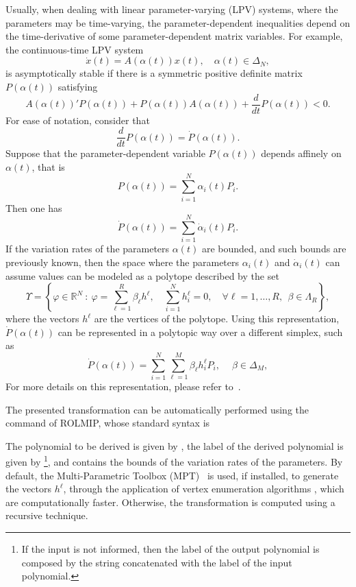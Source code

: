 \documentclass[english,11pt]{article}
\theoremstyle{break} \theorembodyfont{\small\rm}
\begin{document}
Usually, when dealing with linear parameter-varying (LPV) systems, where the parameters
may be time-varying, the parameter-dependent inequalities depend on the time-derivative of
some parameter-dependent matrix variables. For example, the continuous-time LPV system
\[
 \dot{x}(t) = A(\alpha(t))x(t), \quad \alpha(t) \in \Delta_N,
\]
is asymptotically stable if there is a symmetric positive definite matrix $P(\alpha(t))$
satisfying
\[
 A(\alpha(t))'P(\alpha(t)) + P(\alpha(t))A(\alpha(t)) + \frac{d}{d t} P(\alpha(t)) < 0.
\]
For ease of notation, consider that 
\[
 \frac{d}{d t} P(\alpha(t)) = \dot{P}(\alpha(t)).
\]
Suppose that the parameter-dependent variable $P(\alpha(t))$ depends affinely on $\alpha(t)$, that is
\[
 P(\alpha(t)) = \sum_{i = 1}^N \alpha_i(t)P_i.
\]
Then one has
\[
 \dot{P}(\alpha(t)) = \sum_{i = 1}^N \dot{\alpha}_i(t)P_i.
\]
If the variation rates of the parameters $\alpha(t)$ are bounded, and such bounds are previously
known, then the space where the parameters $\alpha_i(t)$ and $\dot{\alpha}_i(t)$ can assume values can be modeled as a polytope described by the set
\[
\Upsilon = \left\{ \varphi \in \mathbb{R}^{N} ~: ~ \varphi =
\sum_{\ell = 1}^{R} \beta_{\ell} h^{\ell},
\quad \sum_{i = 1}^{N} h_i^{\ell} = 0, \quad \forall \ell = 1, \ldots,
R, ~~ \beta \in \Lambda_{R} \right\},
\]
where the vectors $h^{\ell}$ are the vertices of the polytope. Using this representation, $\dot{P}(\alpha(t))$ can be represented in a polytopic way over a different simplex, such as
\[
 \dot{P}(\alpha(t)) = \sum_{i = 1}^N \sum_{\ell = 1}^M \beta_\ell h_i^\ell P_i,~\quad \beta \in \Delta_M,
\]
For more details on this representation, please refer to~\cite{CGTV:07,GC:06a}.

The presented transformation can be automatically performed using the command  of
ROLMIP, whose standard syntax is


\vspace{0.5cm}%
\begin{minipage}{9.5cm}
\end{minipage}
\vspace{0.2cm}

The polynomial to be derived is given by , the label of the derived polynomial
is given by \footnote{If the input  is not informed,
then the label of the output polynomial is composed by the string  concatenated with the
label of the input polynomial.}, and  contains the bounds of the variation 
rates of the parameters. By default, the Multi-Parametric Toolbox (MPT)~\cite{HKJM:13} is used, if installed, 
to generate the vectors $h^\ell$, through the application of vertex enumeration algorithms \cite{AF:92}, which are computationally faster.
Otherwise, the transformation is computed using a recursive technique.
\end{document}

